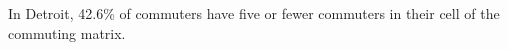 In Detroit, 42.6\% of commuters have five or fewer commuters in their cell of the commuting matrix.
